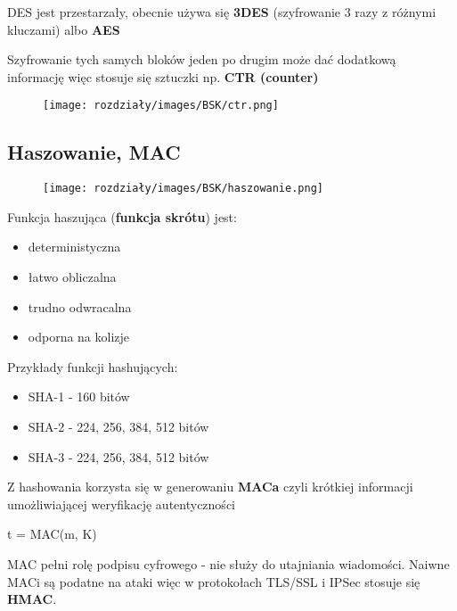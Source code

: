 DES jest przestarzały, obecnie używa się \textbf{3DES} (szyfrowanie 3 razy z różnymi kluczami) albo \textbf{AES}

Szyfrowanie tych samych bloków jeden po drugim może dać dodatkową informację więc stosuje się sztuczki np. \textbf{CTR (counter)}

\begin{figure}[H]
    \centering
    \texttt{[image: rozdziały/images/BSK/ctr.png]}
\end{figure}

\subsection{Haszowanie, MAC}

\begin{figure}[H]
    \centering
    \texttt{[image: rozdziały/images/BSK/haszowanie.png]}
\end{figure}

Funkcja haszująca (\textbf{funkcja skrótu}) jest:
\begin{itemize}
    \item deterministyczna

    \item łatwo obliczalna

    \item trudno odwracalna

    \item odporna na kolizje
\end{itemize}

Przykłady funkcji hashujących:

\begin{itemize}
    \item SHA-1 - 160 bitów

    \item SHA-2 - 224, 256, 384, 512 bitów

    \item SHA-3 - 224, 256, 384, 512 bitów

    
\end{itemize}

Z hashowania korzysta się w generowaniu \textbf{MACa} czyli krótkiej informacji umożliwiającej weryfikację autentyczności

t = MAC(m, K)

MAC pełni rolę podpisu cyfrowego - nie służy do utajniania wiadomości. Naiwne MACi są podatne na ataki więc w protokołach TLS/SSL i IPSec stosuje się \textbf{HMAC}.


